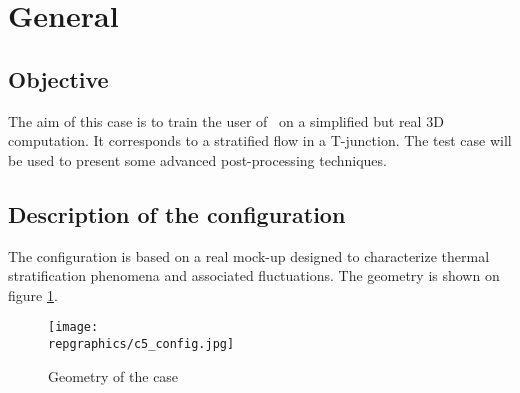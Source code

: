 %
%
%
%
%
%
%
\section{General}

        \subsection{Objective}

The aim of this case is to train the user of \CS\ on a simplified but real 3D
computation. It corresponds to a stratified flow in a T-junction. The test case
will be used to present some advanced post-processing techniques.


        \subsection{Description of the configuration}

The configuration is based on a real mock-up designed to characterize thermal
stratification phenomena and associated fluctuations. The geometry is shown on
figure \ref{config}.


\begin{figure}[h!]
\begin{center}
\texttt{[image: \\repgraphics/c5\_config.jpg]}
\caption{Geometry of the case}
\label{config}
\end{center}
\end{figure}


